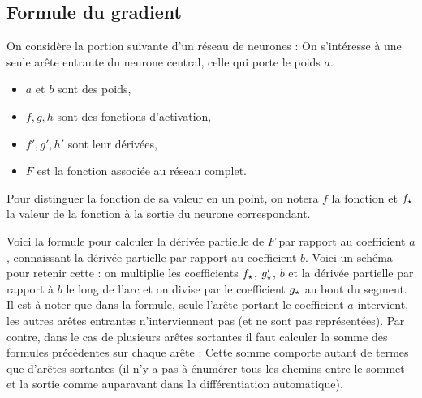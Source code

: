 \subsection{Formule du gradient}

On considère la portion suivante d'un réseau de neurones :
On s'intéresse à une seule arête entrante du neurone central, celle qui porte le poids $a$.
\begin{itemize}
	\item $a$ et $b$ sont des poids,
	\item $f, g, h$ sont des fonctions d'activation,
	\item $f', g', h'$ sont leur dérivées,
	\item $F$ est la fonction associée au réseau complet.
\end{itemize}

Pour distinguer la fonction de sa valeur en un point, on notera $f$ la fonction et $f_\star$ la valeur de la fonction à la sortie du neurone correspondant.

Voici la formule pour calculer la dérivée partielle de $F$ par rapport au coefficient $a$, connaissant la dérivée partielle par rapport au coefficient $b$.
Voici un schéma pour retenir cette \og{}\fg{}:
on multiplie les coefficients $f_\star$, $g'_\star$, $b$ et la dérivée partielle par rapport à $b$ le long de l'arc et on divise par le coefficient $g_\star$ au bout du segment.
Il est à noter que dans la formule, seule l'arête portant le coefficient $a$ intervient, les autres arêtes entrantes n'interviennent pas (et ne sont pas représentées). 
Par contre, dans le cas de plusieurs arêtes sortantes il faut calculer la somme 
des formules précédentes sur chaque arête :
Cette somme comporte autant de termes que d'arêtes sortantes (il n'y a pas à énumérer tous les chemins entre le sommet et la sortie comme auparavant dans la différentiation automatique).

\bigskip

